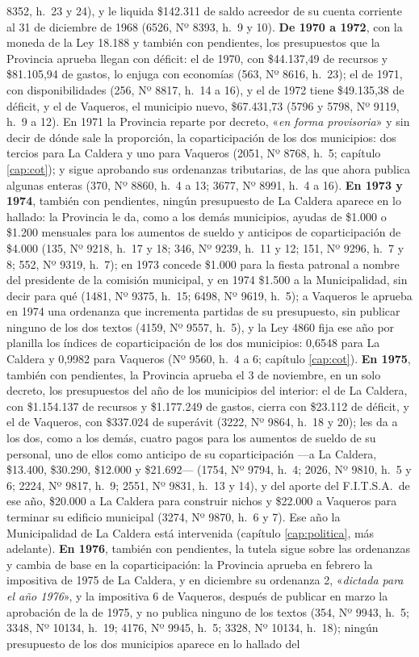 8352, h.\ 23 y 24), y le liquida \$142.311 de saldo acreedor de su cuenta corriente al 31 de diciembre de 1968 (6526, Nº 8393, h.\ 9 y 10). \textbf{De 1970 a 1972}, con la moneda de la Ley 18.188 y también con pendientes, los presupuestos que la Provincia aprueba llegan con déficit: el de 1970, con \$44.137,49 de recursos y \$81.105,94 de gastos, lo enjuga con economías (563, Nº 8616, h.\ 23); el de 1971, con disponibilidades (256, Nº 8817, h.\ 14 a 16), y el de 1972 tiene \$49.135,38 de déficit, y el de Vaqueros, el municipio nuevo, \$67.431,73 (5796 y 5798, Nº 9119, h.\ 9 a 12). En 1971 la Provincia reparte por decreto, «\textit{en forma provisoria}» y sin decir de dónde sale la proporción, la coparticipación de los dos municipios: dos tercios para La Caldera y uno para Vaqueros (2051, Nº 8768, h.\ 5; capítulo \ref{cap:cot}); y sigue aprobando sus ordenanzas tributarias, de las que ahora publica algunas enteras (370, Nº 8860, h.\ 4 a 13; 3677, Nº 8991, h.\ 4 a 16). \textbf{En 1973 y 1974}, también con pendientes, ningún presupuesto de La Caldera aparece en lo hallado: la Provincia le da, como a los demás municipios, ayudas de \$1.000 o \$1.200 mensuales para los aumentos de sueldo y anticipos de coparticipación de \$4.000 (135, Nº 9218, h.\ 17 y 18; 346, Nº 9239, h.\ 11 y 12; 151, Nº 9296, h.\ 7 y 8; 552, Nº 9319, h.\ 7); en 1973 concede \$1.000 para la fiesta patronal a nombre del presidente de la comisión municipal, y en 1974 \$1.500 a la Municipalidad, sin decir para qué (1481, Nº 9375, h.\ 15; 6498, Nº 9619, h.\ 5); a Vaqueros le aprueba en 1974 una ordenanza que incrementa partidas de su presupuesto, sin publicar ninguno de los dos textos (4159, Nº 9557, h.\ 5), y la Ley 4860 fija ese año por planilla los índices de coparticipación de los dos municipios: 0,6548 para La Caldera y 0,9982 para Vaqueros (Nº 9560, h.\ 4 a 6; capítulo \ref{cap:cot}). \textbf{En 1975}, también con pendientes, la Provincia aprueba el 3 de noviembre, en un solo decreto, los presupuestos del año de los municipios del interior: el de La Caldera, con \$1.154.137 de recursos y \$1.177.249 de gastos, cierra con \$23.112 de déficit, y el de Vaqueros, con \$337.024 de superávit (3222, Nº 9864, h.\ 18 y 20); les da a los dos, como a los demás, cuatro pagos para los aumentos de sueldo de su personal, uno de ellos como anticipo de su coparticipación ---a La Caldera, \$13.400, \$30.290, \$12.000 y \$21.692--- (1754, Nº 9794, h.\ 4; 2026, Nº 9810, h.\ 5 y 6; 2224, Nº 9817, h.\ 9; 2551, Nº 9831, h.\ 13 y 14), y del aporte del F.I.T.S.A.\ de ese año, \$20.000 a La Caldera para construir nichos y \$22.000 a Vaqueros para terminar su edificio municipal (3274, Nº 9870, h.\ 6 y 7). Ese año la Municipalidad de La Caldera está intervenida (capítulo \ref{cap:politica}, más adelante). \textbf{En 1976}, también con pendientes, la tutela sigue sobre las ordenanzas y cambia de base en la coparticipación: la Provincia aprueba en febrero la impositiva de 1975 de La Caldera, y en diciembre su ordenanza 2, «\textit{dictada para el año 1976}», y la impositiva 6 de Vaqueros, después de publicar en marzo la aprobación de la de 1975, y no publica ninguno de los textos (354, Nº 9943, h.\ 5; 3348, Nº 10134, h.\ 19; 4176, Nº 9945, h.\ 5; 3328, Nº 10134, h.\ 18); ningún presupuesto de los dos municipios aparece en lo hallado del 